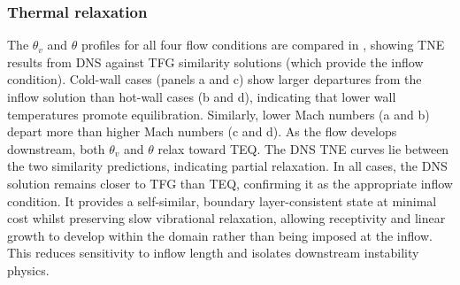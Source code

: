 
\subsubsection{Thermal relaxation}\label{section:disturbance:thermal_relaxation}
The $\theta_v$ and $\theta$ profiles for all four flow conditions are compared in , showing \gls{TNE} results from \gls{DNS} against \gls{TFG} similarity solutions (which provide the inflow condition). Cold-wall cases (panels a and c) show larger departures from the inflow solution than hot-wall cases (b and d), indicating that lower wall temperatures promote equilibration. Similarly, lower Mach numbers (a and b) depart more than higher Mach numbers (c and d). As the flow develops downstream, both $\theta_v$ and $\theta$ relax toward \gls{TEQ}. The \gls{DNS} \gls{TNE} curves lie between the two similarity predictions, indicating partial relaxation. In all cases, the \gls{DNS} solution remains closer to \gls{TFG} than \gls{TEQ}, confirming it as the appropriate inflow condition. It provides a self-similar, boundary layer-consistent state at minimal cost whilst preserving slow vibrational relaxation, allowing receptivity and linear growth to develop within the domain rather than being imposed at the inflow. This reduces sensitivity to inflow length and isolates downstream instability physics.

